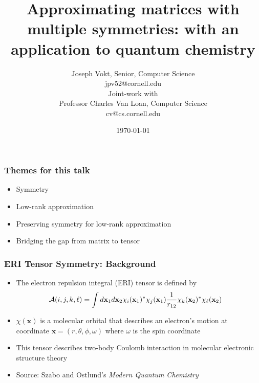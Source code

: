 \documentclass[bigger]{beamer}
\title{Approximating matrices with multiple symmetries: with an application to quantum chemistry}
\author{Joseph Vokt, Senior, Computer Science\\jpv52@cornell.edu\\Joint-work with \\Professor Charles Van Loan, Computer Science\\cv@cs.cornell.edu}
\date{\today}
\begin{document}
\maketitle



\section{}
\begin{frame}
\frametitle{Themes for this talk}
\label{sec-1-1}
\begin{itemize}

\item Symmetry
\label{sec-1-1-1}%

\item Low-rank approximation
\label{sec-1-1-2}%

\item Preserving symmetry for low-rank approximation
\label{sec-1-1-3}%

\item Bridging the gap from matrix to tensor
\label{sec-1-1-4}%
\end{itemize} %
\end{frame}
\begin{frame}
\frametitle{ERI Tensor Symmetry: Background}
\label{sec-1-2}
\begin{itemize}

\item The electron repulsion integral (ERI) tensor is defined by
\label{sec-1-2-1}%
\begin{align*}
&{\cal A}(i,j,k,\ell)
=\int d\textbf{x}_1d\textbf{x}_2 \chi_i(\textbf{x}_1)^*\chi_j(\textbf{x}_1)\frac{1}{r_{12}} \chi_k(\textbf{x}_2)^*\chi_{\ell}(\textbf{x}_2)
\end{align*}

\item $\chi(\textbf{x})$ is a molecular orbital that describes an electron's motion at coordinate $\textbf{x}=(r,\theta,\phi,\omega)$ where $\omega$ is the spin coordinate
\label{sec-1-2-2}%

\item This tensor describes two-body Coulomb interaction in molecular electronic structure theory
\label{sec-1-2-3}%

\item Source: Szabo and Ostlund's \emph{Modern Quantum Chemistry}
\label{sec-1-2-4}%
\end{itemize} %
\end{frame}
\end{document}
